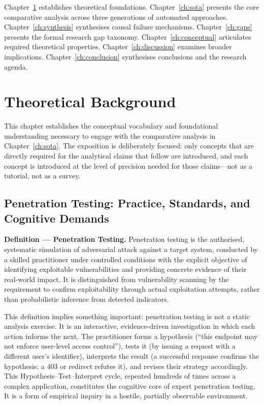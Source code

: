 \documentclass[12pt,a4paper,oneside,openany]{book}
\begin{document}
Chapter~\ref{ch:background} establishes theoretical foundations. Chapter~\ref{ch:sota} presents the core comparative analysis across three generations of automated approaches. Chapter~\ref{ch:synthesis} synthesises causal failure mechanisms. Chapter~\ref{ch:gaps} presents the formal research gap taxonomy. Chapter~\ref{ch:conceptual} articulates required theoretical properties. Chapter~\ref{ch:discussion} examines broader implications. Chapter~\ref{ch:conclusion} synthesises conclusions and the research agenda.


\chapter{Theoretical Background}
\label{ch:background}

This chapter establishes the conceptual vocabulary and foundational understanding necessary to engage with the comparative analysis in Chapter~\ref{ch:sota}. The exposition is deliberately focused: only concepts that are directly required for the analytical claims that follow are introduced, and each concept is introduced at the level of precision needed for those claims---not as a tutorial, not as a survey.

\section{Penetration Testing: Practice, Standards, and Cognitive Demands}

\noindent\textbf{Definition --- Penetration Testing.}
Penetration testing is the authorised, systematic simulation of adversarial attack against a target system, conducted by a skilled practitioner under controlled conditions with the explicit objective of identifying exploitable vulnerabilities and providing concrete evidence of their real-world impact. It is distinguished from vulnerability scanning by the requirement to confirm exploitability through actual exploitation attempts, rather than probabilistic inference from detected indicators.

This definition implies something important: penetration testing is not a static analysis exercise. It is an interactive, evidence-driven investigation in which each action informs the next. The practitioner forms a hypothesis (``this endpoint may not enforce user-level access control''), tests it (by issuing a request with a different user's identifier), interprets the result (a successful response confirms the hypothesis; a 403 or redirect refutes it), and revises their strategy accordingly. This Hypothesis--Test--Interpret cycle, repeated hundreds of times across a complex application, constitutes the cognitive core of expert penetration testing. It is a form of empirical inquiry in a hostile, partially observable environment.
\end{document}
